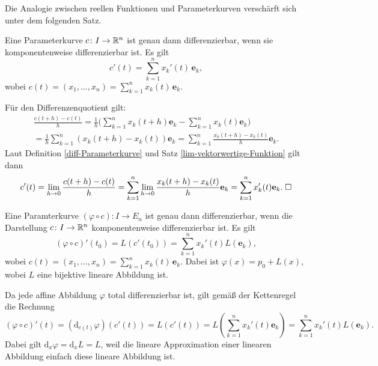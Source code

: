\noindent
Die Analogie zwischen reellen Funktionen und Parameterkurven
verschärft sich unter dem folgenden Satz.

\begin{theorem}
Eine Parameterkurve $c\colon I\to\mathbb R^n$ ist genau dann
differenzierbar, wenn sie komponentenweise differenzierbar
ist. Es gilt
\begin{equation}
c'(t) = \sum_{k=1}^n x_k'(t)\,\mathbf e_k,
\end{equation}
wobei $c(t)=(x_1,\ldots,x_n)=\sum_{k=1}^n x_k(t)\,\mathbf e_k$.
\end{theorem}

\noindent{}
Für den Differenzenquotient gilt:
\begin{gather}
\frac{c(t+h)-c(t)}{h}
= \frac{1}{h}\bigg(\sum_{k=1}^n x_k(t+h)\mathbf e_k-\sum_{k=1}^n x_k(t)\mathbf e_k\bigg)\\
= \frac{1}{h}\sum_{k=1}^n (x_k(t+h)-x_k(t))\mathbf e_k
= \sum_{k=1}^n \frac{x_k(t+h)-x_k(t)}{h}\mathbf e_k.
\end{gather}
Laut Definition \ref{diff-Parameterkurve} und
Satz \ref{lim-vektorwertige-Funktion} gilt dann
\begin{equation}
c'(t) = \lim_{h\to 0}\frac{c(t+h)-c(t)}{h}
= \sum_{k=1}^n \lim_{h\to 0}\frac{x_k(t+h)-x_k(t)}{h}\mathbf e_k
= \sum_{k=1}^n x_k'(t)\mathbf e_k.\;\Box
\end{equation}

\begin{theorem}
Eine Paramterkurve $(\varphi\circ c)\colon I\to E_n$ ist genau dann
differenzierbar, wenn die Darstellung $c\colon I\to\mathbb R^n$
komponentenweise differenzierbar ist. Es gilt
\begin{equation}
(\varphi\circ c)'(t_0) = L(c'(t_0))
= \sum_{k=1}^n x_k'(t) L(\mathbf e_k),
\end{equation}
wobei $c(t) = (x_1,\ldots,x_n) = \sum_{k=1}^n x_k(t)\,\mathbf e_k$.
Dabei ist $\varphi(x) = p_0+L(x)$, wobei $L$ eine bijektive lineare
Abbildung ist.
\end{theorem}

\noindent{}
Da jede affine Abbildung $\varphi$ total differenzierbar ist, gilt gemäß
der Kettenregel die Rechnung%
\begin{equation}
(\varphi\circ c)'(t) = (\mathrm d_{c(t)}\varphi)(c'(t))
= L(c'(t)) = L(\sum_{k=1}^n x_k'(t)\mathbf e_k)
= \sum_{k=1}^n x_k'(t)L(\mathbf e_k).
\end{equation}
Dabei gilt $\mathrm d_x \varphi = \mathrm d_x L = L$, weil die lineare
Approximation einer linearen Abbildung einfach diese lineare Abbildung
ist.\;\qedsymbol


